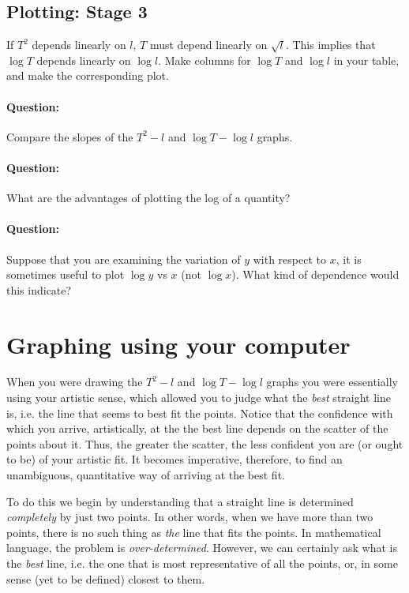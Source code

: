 \subsection{Plotting: Stage 3}

If $T^2$ depends linearly on $l$, $T$ must depend linearly on $\sqrt{l}$. This implies that $\log T$ depends linearly on $\log l$. Make columns for $\log T$ and $\log l$ in your table, and make the corresponding plot. 

\begin{question}
\paragraph{Question:} Compare the slopes of the $T^2 - l$ and $\log T - \log l$ graphs. 

\paragraph{Question:} What are the advantages of plotting the log of a quantity?

\paragraph{Question:} Suppose that you are examining the variation of $y$ with respect to $x$, it is sometimes useful to plot $\log y$ vs $x$ (not $\log x$). What kind of dependence would this indicate?

\end{question}

\section{Graphing using your computer}

When you were drawing the $T^2 - l$ and $\log T - \log l$ graphs you were essentially using your artistic sense, which allowed you to judge what the \textit{best} straight line is, i.e. the line that seems to best fit the points. Notice that the confidence with which you arrive, artistically, at the the best line depends on the scatter of the points about it. Thus, the greater the scatter, the less confident you are (or ought to be) of your artistic fit. It becomes imperative, therefore, to find an unambiguous, quantitative way of arriving at the best fit. 

To do this we begin by understanding that a straight line is determined \textit{completely} by just two points. In other words, when we have more than two points, there is no such thing as \textit{the} line that fits the points. In mathematical language, the problem is \textit{over-determined}. However, we can certainly ask what is the \textit{best} line, i.e. the one that is most representative of all the points, or, in some sense (yet to be defined) closest to them.

